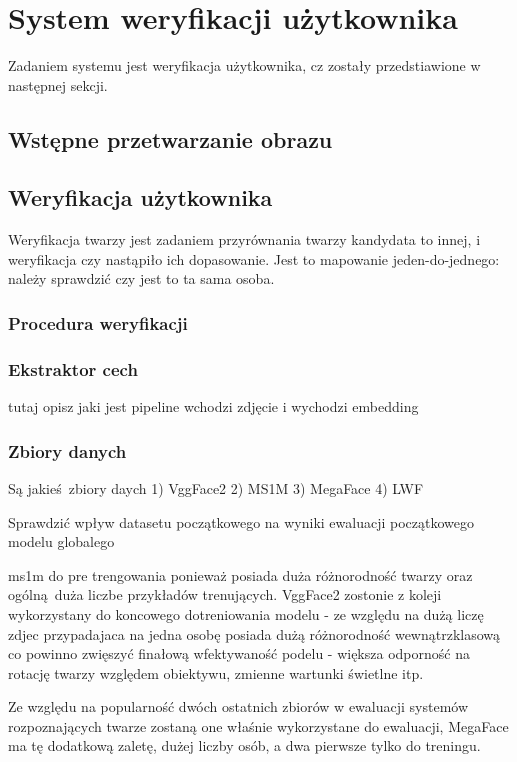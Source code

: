 \section{System weryfikacji użytkownika}
Zadaniem systemu jest weryfikacja użytkownika, cz zostały przedstiawione w następnej sekcji.

\subsection{Wstępne przetwarzanie obrazu}

\subsection{Weryfikacja użytkownika}

Weryfikacja twarzy jest zadaniem przyrównania twarzy
kandydata to innej, i weryfikacja czy nastąpiło ich dopasowanie. Jest to mapowanie
jeden-do-jednego: należy sprawdzić czy jest to ta sama osoba.

\subsubsection{Procedura weryfikacji} 

\subsubsection{Ekstraktor cech}
tutaj opisz jaki jest pipeline  
wchodzi zdjęcie i wychodzi embedding

\subsubsection{Zbiory danych}
Są jakieś zbiory daych 
1) VggFace2
2) MS1M
3) MegaFace
4) LWF

Sprawdzić wpływ datasetu początkowego na wyniki ewaluacji początkowego modelu globalego

ms1m do pre trengowania ponieważ posiada duża różnorodność twarzy oraz ogólną duża liczbe przykładów trenujących. VggFace2 zostonie z koleji wykorzystany do koncowego dotreniowania modelu - ze względu na dużą liczę zdjec przypadajaca na jedna osobę posiada dużą różnorodność wewnątrzklasową co powinno zwięszyć finałową wfektywaność podelu - większa odporność na rotację twarzy względem obiektywu, zmienne wartunki świetlne itp.

Ze względu na popularność dwóch ostatnich zbiorów w ewaluacji systemów rozpoznających twarze zostaną one właśnie wykorzystane do ewaluacji, MegaFace ma tę dodatkową zaletę, dużej liczby osób, a dwa pierwsze tylko do treningu.



